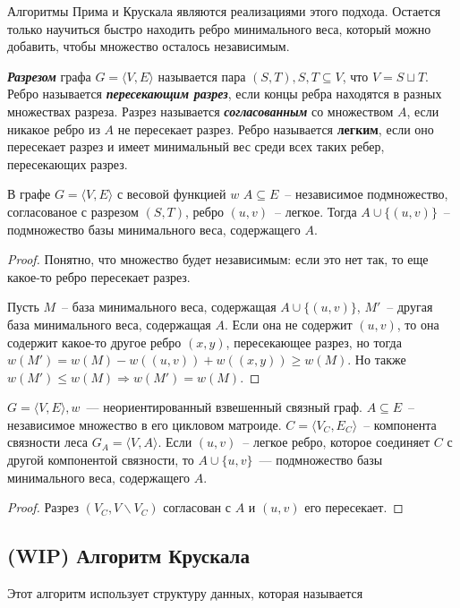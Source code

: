 Алгоритмы Прима и Крускала являются реализациями этого подхода. Остается только научиться быстро находить ребро минимального веса, который можно добавить, чтобы множество осталось независимым.
\begin{definition}
	{\bf\it Разрезом} графа $G=\langle V,E\rangle$ называется пара $(S,T),S,T\subseteq V$, что $V=S\sqcup T$. Ребро называется {\bf\it пересекающим разрез}, если концы ребра находятся в разных множествах разреза. Разрез называется {\bf\it согласованным} со множеством $A$, если никакое ребро из $A$ не пересекает разрез. Ребро называется {\bf легким}, если оно пересекает разрез и имеет минимальный вес среди всех таких ребер, пересекающих разрез.
\end{definition}
\begin{theorem}
	В графе $G=\langle V,E\rangle$ с весовой функцией $w$ $A\subseteq E$~-- независимое подмножество, согласованое с разрезом $(S,T)$, ребро $(u,v)$~-- легкое. Тогда $A\cup\{(u,v)\}$~-- подмножество базы минимального веса, содержащего $A$.
\end{theorem}
\begin{proof}
	Понятно, что множество будет независимым: если это нет так, то еще какое-то ребро пересекает разрез.

	Пусть $M$~-- база минимального веса, содержащая $A\cup\{(u,v)\}$, $M'$~-- другая база минимального веса, содержащая $A$. Если она не содержит $(u,v)$, то она содержит какое-то другое ребро $(x,y)$, пересекающее разрез, но тогда $w(M')=w(M)-w((u,v))+w((x,y))\ge w(M)$. Но также $w(M')\le w(M)\Rightarrow w(M')=w(M)$.
\end{proof}
\begin{corollary}\label{cor}
	$G=\langle V,E\rangle,w$~--- неориентированный взвешенный связный граф. $A\subseteq E$~-- независимое множество в его цикловом матроиде. $C=\langle V_C,E_C\rangle$~-- компонента связности леса $G_A=\langle V,A\rangle$. Если $(u,v)$~-- легкое ребро, которое соединяет $C$ с другой компонентой связности, то $A\cup\{u,v\}$~--- подмножество базы минимального веса, содержащего $A$.
\end{corollary}
\begin{proof}
	Разрез $(V_C,V\smallsetminus V_C)$ согласован с $A$ и $(u,v)$ его пересекает.
\end{proof}
\subsection{(WIP) Алгоритм Крускала}
Этот алгоритм использует структуру данных, которая называется
